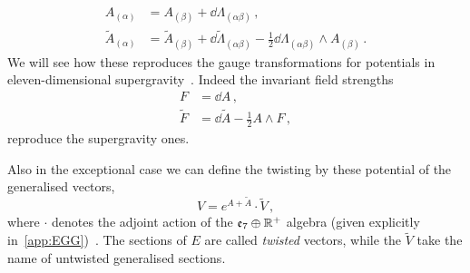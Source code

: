 \documentclass[debug]{phd}
\begin{document}
								\begin{equation}
									\begin{split}
										A_{(\alpha)} 		&= A_{(\beta)} + \dd \Lambda_{(\alpha\beta)} \, , \\
										\tilde{A}_{(\alpha)} 	&= \tilde{A}_{(\beta)} + \dd \tilde{\Lambda}_{(\alpha\beta)} - \frac{1}{2} \dd \Lambda_{(\alpha\beta)} \wedge A_{(\beta)} \, .
									\end{split}
								\end{equation}
						We will see how these reproduces the gauge transformations for potentials in eleven-dimensional supergravity~\cite{waldram4, waldram5, hull1}.
						Indeed the invariant field strengths 
								\begin{equation}
									\begin{split}
										F		&= \dd A \, , \\
										\tilde{F} 	&= \dd\tilde{A} - \frac{1}{2} A \wedge F \, ,
									\end{split}
								\end{equation}
						reproduce the supergravity ones.
						
						Also in the exceptional case we can define the twisting by these potential of the generalised vectors,
								\begin{equation}
									V = e^{A+ \tilde{A}} \cdot \tilde{V} \, , 
								\end{equation}
						where $\cdot$ denotes the adjoint action of the $\mathfrak{e}_7 \oplus \mathbb{R}^+$ algebra (given explicitly in~\cref{app:EGG})~\cite{waldram5}.
						The sections of $E$ are called \emph{twisted} vectors, while the $\tilde{V}$ take the name of untwisted generalised sections.
							
\end{document}

